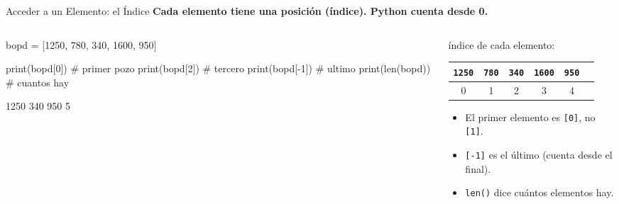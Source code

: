 \documentclass[aspectratio=169, 11pt]{beamer}
\begin{document}
\begin{frame}[fragile,shrink=20]{Acceder a un Elemento: el Índice}
  \vspace{-4pt}
  {\small\color{arcaDark}\bfseries
    Cada elemento tiene una \textbf{posición} (índice). Python cuenta \textbf{desde 0}.}

  \vspace{5pt}
  \begin{columns}[T]
    \begin{column}{0.54\textwidth}
      \begin{pyblock}
bopd = [1250, 780, 340, 1600, 950]

print(bopd[0])    # primer pozo
print(bopd[2])    # tercero
print(bopd[-1])   # ultimo
print(len(bopd))  # cuantos hay
      \end{pyblock}
      \vspace{2pt}
      \begin{outputblock}
1250
340
950
5
      \end{outputblock}
    \end{column}

    \begin{column}{0.42\textwidth}
      \centering
      {\scriptsize\color{textMuted} índice de cada elemento:}\\[3pt]
      {\scriptsize\ttfamily
      \begin{tabular}{cccccc}
        \texttt{1250} & \texttt{780} & \texttt{340} & \texttt{1600} & \texttt{950}\\
        \midrule
        0 & 1 & 2 & 3 & 4\\
      \end{tabular}}

      \vspace{6pt}
      {\scriptsize\color{textMuted}
      \begin{itemize}\setlength{\itemsep}{3pt}
        \item[{\color{arcaRed}\scriptsize\faArrowRight}]
          El primer elemento es \texttt{[0]}, no \texttt{[1]}.
        \item[{\color{arcaRed}\scriptsize\faArrowRight}]
          \texttt{[-1]} es el último (cuenta desde el final).
        \item[{\color{arcaRed}\scriptsize\faArrowRight}]
          \texttt{len()} dice cuántos elementos hay.
      \end{itemize}
      }
    \end{column}
  \end{columns}
\end{frame}
\end{document}
